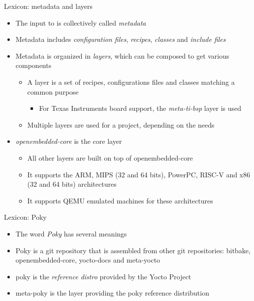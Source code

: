 \begin{frame}{Lexicon: metadata and layers}
  \begin{itemize}
    \item The input to  is collectively called {\em metadata}
    \item Metadata includes {\em configuration files}, {\em recipes}, {\em
      classes} and {\em include files}
    \item Metadata is organized in {\em layers}, which can be composed to
      get various components
      \begin{itemize}
        \item A layer is a set of recipes, configurations files and classes
          matching a common purpose
      \begin{itemize}
        \item For Texas Instruments board support, the {\em meta-ti-bsp}
          layer is used
      \end{itemize}
      \item Multiple layers are used for a project, depending on the needs
      \end{itemize}
    \item {\em openembedded-core} is the core layer
      \begin{itemize}
        \item All other layers are built on top of openembedded-core
        \item It supports the ARM, MIPS (32 and 64 bits), PowerPC, RISC-V
          and x86 (32 and 64 bits) architectures
        \item It supports QEMU emulated machines for these architectures
      \end{itemize}
  \end{itemize}
\end{frame}

\begin{frame}{Lexicon: Poky}
  \begin{itemize}
  \item The word {\em Poky} has several meanings
  \item Poky is a git repository that is assembled from other git
    repositories: bitbake, openembedded-core, yocto-docs and meta-yocto
  \item poky is the {\em reference distro} provided by the Yocto Project
  \item meta-poky is the layer providing the poky reference distribution
  \end{itemize}
\end{frame}

